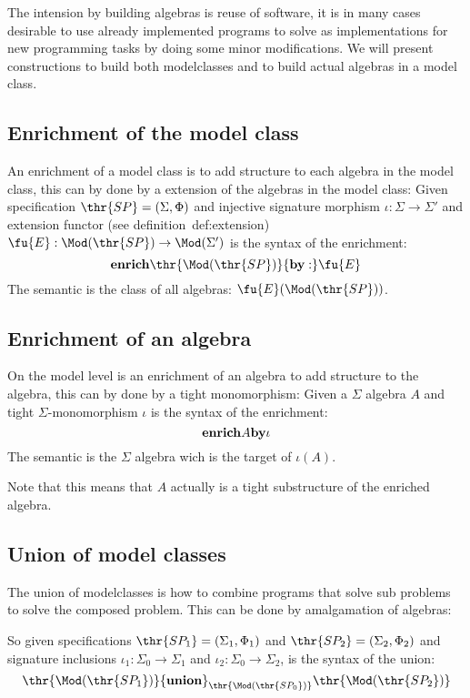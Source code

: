 The intension by building algebras is reuse of software, it is in many cases desirable to use already implemented programs to solve as implementations for new programming tasks by doing some minor modifications. We will present constructions to build both modelclasses and to build actual algebras in a model class.

\subsection{Enrichment of the model class}
An enrichment of a model class is to add structure to each algebra in the model class, this can by done by a extension of the algebras in the model class:
Given specification $\thr{SP}= (\Sigma,\Phi)$ and injective signature morphism $\iota:\Sigma \to \Sigma'$ and extension functor (see definition~{def:extension}) $\fu{E}: \Mod(\thr{SP}) \to \Mod(\Sigma')$ is the syntax of the enrichment:
	\[ {\bf enrich} \thr{\Mod(\thr{SP})} {\bf by:} \fu{E} \]
The semantic is the class of all algebras: $\fu{E}(\Mod(\thr{SP}))$.



\subsection{Enrichment of an algebra}
On the model level is an enrichment of an algebra to add structure to the algebra, this can by done by a tight monomorphism:
Given a $\Sigma$ algebra $A$ and tight $\Sigma$-monomorphism $\iota$ is the syntax of the enrichment:
	\[ {\bf enrich} A {\bf by} \iota \]
The semantic is the $\Sigma$ algebra wich is the target of $\iota(A)$.

Note that this means that $A$ actually is a tight substructure of the enriched algebra.

\subsection{Union of model classes}
The union of modelclasses is how to combine programs that solve sub problems to solve the composed problem. This can be done by amalgamation of algebras:

So given specifications $\thr{SP_1} = (\Sigma_1,\Phi_1)$ and $\thr{SP_2}= (\Sigma_2,\Phi_2)$ and signature inclusions $\iota_1: \Sigma_0 \to \Sigma_1$ and $\iota_2: \Sigma_0 \to \Sigma_2$, is the syntax of the union: 
	\[ \thr{\Mod(\thr{SP_1})} {\bf union}_\thr{\Mod(\thr{SP_0})} \thr{\Mod(\thr{SP_2})} \]

